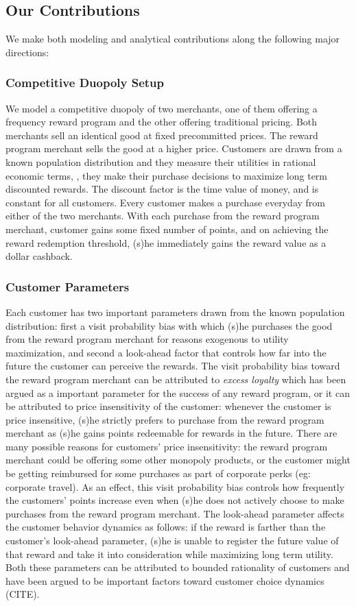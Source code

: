 \subsection{Our Contributions}
We make both modeling and analytical contributions along the following major directions:

\subsubsection{Competitive Duopoly Setup}
We model a competitive duopoly of two merchants, one of them offering a frequency reward program and the other offering traditional pricing.
Both merchants sell an identical good at fixed precommitted prices.
The reward program merchant sells the good at a higher price.
Customers are drawn from a known population distribution and they measure their utilities in rational economic terms, \ie, they make their purchase decisions to maximize long term discounted rewards.
The discount factor is the time value of money, and is constant for all customers.
Every customer makes a purchase everyday from either of the two merchants.
With each purchase from the reward program merchant, customer gains some fixed number of points, and on achieving the reward redemption threshold, (s)he immediately gains the reward value as a dollar cashback.

\subsubsection{Customer Parameters}
Each customer has two important parameters drawn from the known population distribution: first a visit probability bias with which (s)he purchases the good from the reward program merchant for reasons exogenous to utility maximization, and second a look-ahead factor that controls how far into the future the customer can perceive the rewards.
The visit probability bias toward the reward program merchant can be attributed to \emph{excess loyalty} which has been argued as a important parameter for the success of any reward program, or it can be attributed to price insensitivity of the customer: whenever the customer is price insensitive, (s)he strictly prefers to purchase from the reward program merchant as (s)he gains points redeemable for rewards in the future.
There are many possible reasons for customers' price insensitivity: the reward program merchant could be offering some other monopoly products, or the customer might be getting reimbursed for some purchases as part of corporate perks (eg: corporate travel).
As an effect, this visit probability bias controls how frequently the customers' points increase even when (s)he does not actively choose to make purchases from the reward program merchant.
The look-ahead parameter affects the customer behavior dynamics as follows: if the reward is farther than the customer's look-ahead parameter, (s)he is unable to register the future value of that reward and take it into consideration while maximizing long term utility.
Both these parameters can be attributed to bounded rationality of customers and have been argued to be important factors toward customer choice dynamics (CITE).


